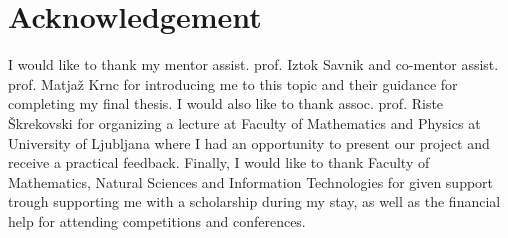 
\newpage
\section*{Acknowledgement}

I would like to thank my mentor assist. prof. Iztok Savnik and co-mentor 
assist. prof. Matja\v z Krnc for introducing me to this topic and their guidance 
for completing my final thesis. I would also like to thank assoc. prof. Riste 
\v Skrekovski for organizing a lecture at Faculty of Mathematics and Physics at 
University of Ljubljana where I had an opportunity to present our project and 
receive a practical feedback. Finally, I would like to thank Faculty of Mathematics, 
Natural Sciences and Information Technologies for given support trough supporting me 
with a scholarship during my stay, as well as the financial help for attending competitions 
and conferences.

\newpage

\tableofcontents
{}
\newpage
\listoffigures
{}
\newpage

\normalsize
